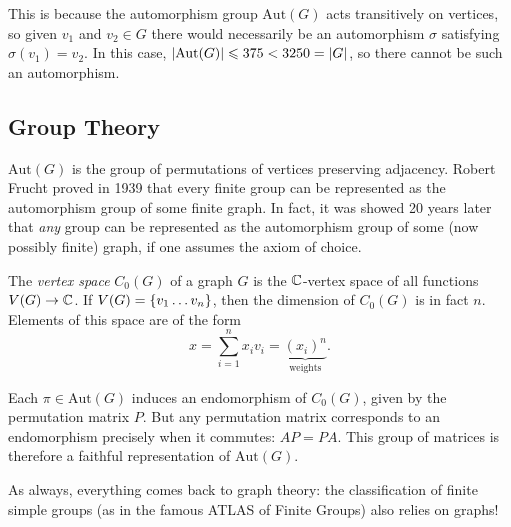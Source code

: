 \documentclass{article}
\begin{document}
This is because the automorphism group $\mathrm{Aut}(G)$ acts transitively on vertices, so given $v_1$ and $v_2 \in G$ there would necessarily be an automorphism $\sigma$ satisfying $\sigma(v_1) = v_2$. In this case, $\left\lvert \mathrm{Aut}(G) \right\rvert \leqslant 375 < 3250 = \left\lvert G \right\rvert$, so there cannot be such an automorphism.


\subsection{Group Theory}

$\mathrm{Aut}(G)$ is the group of permutations of vertices preserving adjacency. Robert Frucht proved in 1939 that every finite group can be represented as the automorphism group of some finite graph. In fact, it was showed 20 years later that \textit{any} group can be represented as the automorphism group of some (now possibly finite) graph, if one assumes the axiom of choice.

\begin{definition}
    The \textit{vertex space} $C_0 (G)$ of a graph $G$ is the $\mathbb{C}$-vertex space of all functions $V(G) \to \mathbb{C}$. If $V(G) = \left\lbrace v_1 \dots v_n \right\rbrace$, then the dimension of $C_0(G)$ is in fact $n$. Elements of this space are of the form
    \[
	x = \sum_{i=1}^n x_i v_i = \underbrace{(x_i)^n}_{\text{weights}}.
	\]
\end{definition}

Each $\pi \in \mathrm{Aut}(G)$ induces an endomorphism of $C_0(G)$, given by the permutation matrix $P$. But any permutation matrix corresponds to an endomorphism precisely when it commutes: $AP = PA$. This group of matrices is therefore a faithful representation of $\mathrm{Aut}(G)$.

As always, everything comes back to graph theory: the classification of finite simple groups (as in the famous ATLAS of Finite Groups) also relies on graphs!
\end{document}
